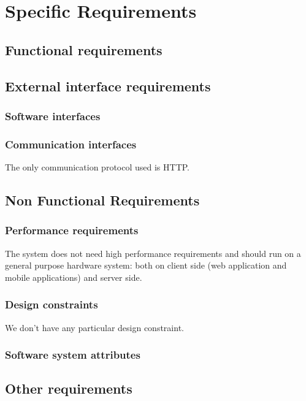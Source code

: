\chapter{Specific Requirements}
\section{Functional requirements}


\section{External interface requirements}

\subsection{Software interfaces}
\subsection{Communication interfaces}
The only communication protocol used is HTTP.


\section{Non Functional Requirements}
\subsection{Performance requirements}
The system does not need high performance requirements and should run on a general purpose hardware system: both on client side (web application and mobile applications) and server side.
\subsection{Design constraints}
We don't have any particular design constraint.
\subsection{Software system attributes}
\section{Other requirements}